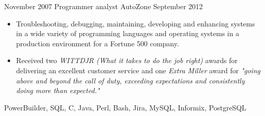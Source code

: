 \begin{experiences}
    \experience
        {November 2007}
        {Programmer analyst}
        {AutoZone}
        {September 2012}
        {
            \begin{itemize}
                \item Troubleshooting, debugging, maintaining, developing and 
                    enhancing systems in a wide variety of programming 
                    languages and operating systems in a production environment 
                    for a Fortune 500 company.
                \item Received two \textit{WITTDJR (What it takes to do the job 
                    right)} awards for delivering an excellent customer service 
                    and one \textit{Extra Miller} award for \textit{"going 
                    above and beyond the call of duty, exceeding expectations 
                    and consistently doing more than expected."}
            \end{itemize}
        }
        {
            PowerBuilder, 
            SQL, 
            C, 
            Java, 
            Perl, 
            Bash, 
            Jira, 
            MySQL, 
            Informix, 
            PostgreSQL
        }

\end{experiences}
